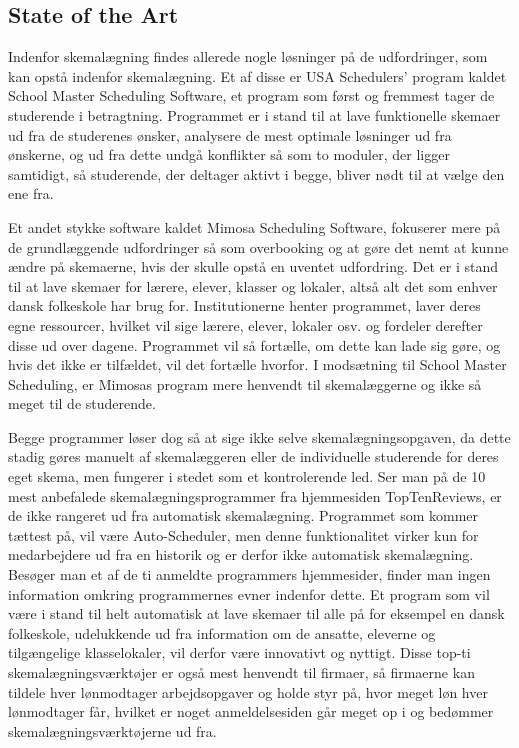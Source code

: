 \subsection{State of the Art}
\label{sota}
Indenfor skemalægning findes allerede nogle løsninger på de udfordringer, som kan opstå indenfor skemalægning. Et af disse er USA Schedulers' program kaldet School Master Scheduling Software\cite{USAS}, et program som først og fremmest tager de studerende i betragtning. Programmet er i stand til at lave funktionelle skemaer ud fra de studerenes ønsker, analysere de mest optimale løsninger ud fra ønskerne, og ud fra dette undgå konflikter så som to moduler, der ligger samtidigt, så studerende, der deltager aktivt i begge, bliver nødt til at vælge den ene fra.

Et andet stykke software kaldet Mimosa Scheduling Software\cite{Mimosa}, fokuserer mere på de grundlæggende udfordringer så som overbooking og at gøre det nemt at kunne ændre på skemaerne, hvis der skulle opstå en uventet udfordring. Det er i stand til at lave skemaer for lærere, elever, klasser og lokaler, altså alt det som enhver dansk folkeskole har brug for. Institutionerne henter programmet, laver deres egne ressourcer, hvilket vil sige lærere, elever, lokaler osv. og fordeler derefter disse ud over dagene. Programmet vil så fortælle, om dette kan lade sig gøre, og hvis det ikke er tilfældet, vil det fortælle hvorfor\cite{MimosaTutorial}. I modsætning til School Master Scheduling, er Mimosas program mere henvendt til skemalæggerne og ikke så meget til de studerende. 

Begge programmer løser dog så at sige ikke selve skemalægningsopgaven, da dette stadig gøres manuelt af skemalæggeren eller de individuelle studerende for deres eget skema, men fungerer i stedet som et kontrolerende led. Ser man på de 10 mest anbefalede skemalægningsprogrammer fra hjemmesiden TopTenReviews\cite{top10Schedulers}, er de ikke rangeret ud fra automatisk skemalægning. Programmet som kommer tættest på, vil være Auto-Scheduler, men denne funktionalitet virker kun for medarbejdere ud fra en historik og er derfor ikke automatisk skemalægning. Besøger man et af de ti anmeldte programmers hjemmesider, finder man ingen information omkring programmernes evner indenfor dette. Et program som vil være i stand til helt automatisk at lave skemaer til alle på for eksempel en dansk folkeskole, udelukkende ud fra information om de ansatte, eleverne og tilgængelige klasselokaler, vil derfor være innovativt og nyttigt. Disse top-ti skemalægningsværktøjer er også mest henvendt til firmaer, så firmaerne kan tildele hver lønmodtager arbejdsopgaver og holde styr på, hvor meget løn hver lønmodtager får, hvilket er noget anmeldelsesiden går meget op i og bedømmer skemalægningsværktøjerne ud fra.

